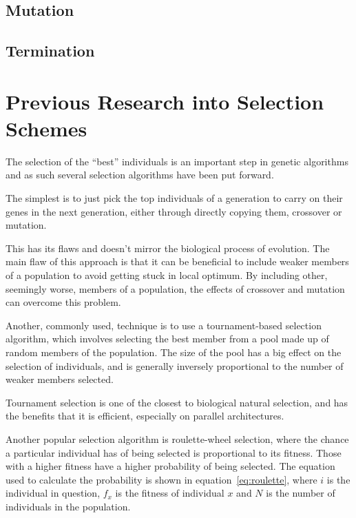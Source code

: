 \documentclass[10pt, a4paper]{article}
\begin{document}
\subsection{Mutation}


\subsection{Termination}


\FloatBarrier

\newpage
\section{Previous Research into Selection Schemes}
\label{sec:selection-algorithms}

The selection of the ``best'' individuals is an important step in genetic
algorithms and as such several selection algorithms have been put forward.

The simplest is to just pick the top individuals of a generation to carry on
their genes in the next generation, either through directly copying them, 
crossover or mutation.

This has its flaws and doesn't mirror the biological process of evolution. The
main flaw of this approach is that it can be beneficial to include weaker 
members of a population to avoid getting stuck in local optimum. By including
other, seemingly worse, members of a population, the effects of crossover and
mutation can overcome this problem.

Another, commonly used, technique is to use a tournament-based selection 
algorithm, which involves selecting the best member from a pool made up of
random members of the population. The size of the pool has a big effect on the
selection of individuals, and is generally inversely proportional to the
number of weaker members selected.

Tournament selection is one of the closest to biological natural selection,
and has the benefits that it is efficient, especially on parallel 
architectures.

Another popular selection algorithm is roulette-wheel selection, where the
chance a particular individual has of being selected is proportional to its
fitness. Those with a higher fitness have a higher probability of being 
selected. The equation used to calculate the probability is shown in 
equation~\ref{eq:roulette}, where $i$ is the individual in question, $f_x$ is
the fitness of individual $x$ and $N$ is the number of individuals in the 
population.
\end{document}
